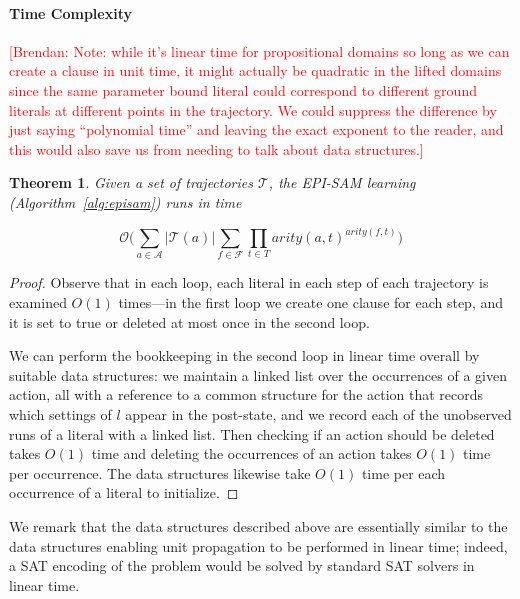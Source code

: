 \documentclass[letterpaper]{article} %
\newtheorem{theorem}{Theorem}
\newcommand{\brendan}[1]{{\textcolor{red}{[Brendan: #1]}}}
\begin{document}
\paragraph{Time Complexity}
\brendan{Note: while it's linear time for propositional domains so long as we can create a clause in unit time, it might actually be quadratic in the lifted domains since the same parameter bound literal could correspond to different ground literals at different points in the trajectory. We could suppress the difference by just saying ``polynomial time'' and leaving the exact exponent to the reader, and this would also save us from needing to talk about data structures.}
\begin{theorem}
Given a set of trajectories $\mathcal{T}$, the EPI-SAM learning (Algorithm~\ref{alg:episam}) runs in time 
\begin{small}
\[\mathcal{O}\Big(\sum_{a\in \mathcal{A}}|\mathcal{T}(a)|\sum_{f\in\mathcal{F}}\prod_{t\in T}arity(a,t)^{arity(f,t)}\Big)\]
\end{small}
\end{theorem}
\begin{proof}
Observe that in each loop, each literal in each step of each trajectory is examined $O(1)$ times---in the first loop we create one clause for each step, and it is set to true or deleted at most once in the second loop. 

We can perform the bookkeeping in the second loop in linear time overall by suitable data structures: we maintain a linked list over the occurrences of a given action, all with a reference to a common structure for the action that records which settings of $l$ appear in the post-state, and we record each of the unobserved runs of a literal with a linked list. Then checking if an action should be deleted takes $O(1)$ time and deleting the occurrences of an action takes $O(1)$ time per occurrence. The data structures likewise take $O(1)$ time per each occurrence of a literal to initialize.
\end{proof}
We remark that the data structures described above are essentially similar to the data structures enabling unit propagation to be performed in linear time; indeed, a SAT encoding of the problem would be solved by standard SAT solvers in linear time.
\end{document}

